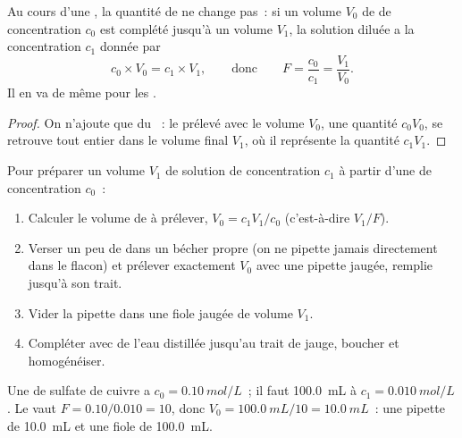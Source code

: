 \begin{proposition}\label{prop:g10:concentration-and-dilution:kept}
Au cours d'une , la quantité de  ne change pas~: si un
volume $V_0$ de  de concentration $c_0$ est complété jusqu'à
un volume $V_1$, la solution diluée a la concentration $c_1$ donnée par
\[
  c_0 \times V_0 = c_1 \times V_1,
  \qquad\text{donc}\qquad
  F = \frac{c_0}{c_1} = \frac{V_1}{V_0} .
\]
Il en va de même pour les .
\end{proposition}

\begin{proof}
On n'ajoute que du ~: le  prélevé avec le volume $V_0$, une
quantité $c_0 V_0$, se retrouve tout entier dans le volume final $V_1$,
où il représente la quantité $c_1 V_1$.
\end{proof}


\begin{method}\label{met:g10:concentration-and-dilution:diluting}
Pour préparer un volume $V_1$ de solution de concentration $c_1$ à partir
d'une  de concentration $c_0$~:
\begin{enumerate}
  \item Calculer le volume de  à prélever,
        $V_0 = c_1 V_1 / c_0$ (c'est-à-dire $V_1 / F$).
  \item Verser un peu de  dans un bécher propre (on ne
        pipette jamais directement dans le flacon) et prélever exactement
        $V_0$ avec une pipette jaugée, remplie jusqu'à son trait.
  \item Vider la pipette dans une fiole jaugée de volume $V_1$.
  \item Compléter avec de l'eau distillée jusqu'au trait de jauge,
        boucher et homogénéiser.
\end{enumerate}
\end{method}

\begin{example}\label{ex:g10:concentration-and-dilution:tenfold}
Une  de sulfate de cuivre a $c_0 = \qty{0.10}{mol/L}$~; il
faut \qty{100.0}{mL} à $c_1 = \qty{0.010}{mol/L}$. Le  vaut $F = 0.10 / 0.010 = 10$, donc $V_0 = \qty{100.0}{mL} / 10 =
\qty{10.0}{mL}$~: une pipette de \qty{10.0}{mL} et une fiole de
\qty{100.0}{mL}.
\end{example}

